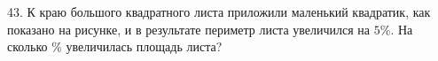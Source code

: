 43. К краю большого квадратного листа приложили маленький квадратик, как показано на рисунке, и в результате периметр листа увеличился на $5\%.$ На сколько $\%$ увеличилась площадь листа?
\begin{figure}[h]
\end{figure}\\

